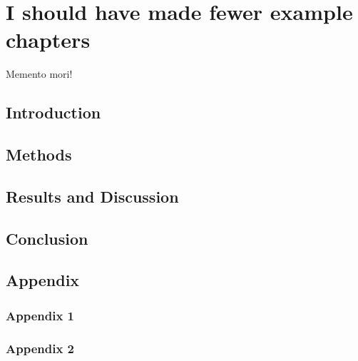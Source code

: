 \cleardoubleevenemptypage
\chapter{I should have made fewer example chapters}
\label{ch:name}
\pgfmathsetmacro\chapclr{\colourarray[5]}
\hypersetup{
  citecolor  = \chapclr,
  linkcolor  = \chapclr,
  urlcolor   = \chapclr,
}

\epigraph{
  Memento mori!
}{
  
}

\begin{center}
  \begin{minipage}{\abstractwidth\textwidth}
    \begin{small}
      \lipsum[1]
      \end{small}
  \end{minipage}
  \vspace{0.5cm}
\end{center}

\clearpage

\section{Introduction}

\blindtext[2]

\section{Methods}
\blindtext[1]
\blindmathtrue
\blindtext[1]

\section{Results and Discussion}
\blindtext[3]


\section{Conclusion}
\lipsum[1-2]

\clearpage
\section{Appendix}

\subsection{Appendix 1}

\blindtext[1]

\subsection{Appendix 2}

\blindtext[1]
